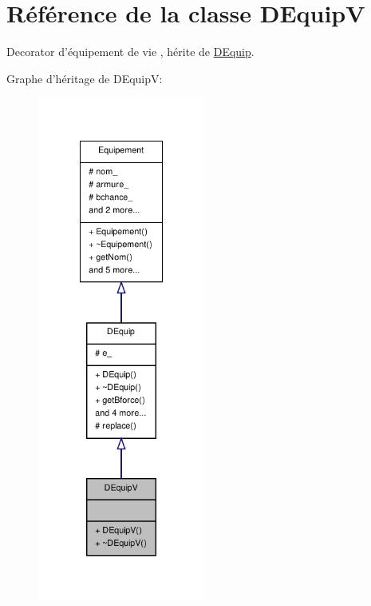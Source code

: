 \hypertarget{class_d_equip_v}{\section{Référence de la classe D\-Equip\-V}
\label{class_d_equip_v}
}


Decorator d'équipement de vie , hérite de \hyperlink{class_d_equip}{D\-Equip}.  




Graphe d'héritage de D\-Equip\-V\-:
\nopagebreak
\begin{figure}[H]
\begin{center}
\leavevmode
\includegraphics[width=156pt]{class_d_equip_v__inherit__graph}
\end{center}
\end{figure}


